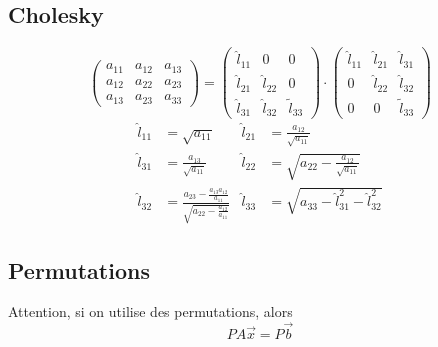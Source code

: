 \documentclass[]{article}
\begin{document}
\begin{multicols}{3}
\subsection{Cholesky}
$$\begin{pmatrix}
a_{11} & a_{12} & a_{13}\\
a_{12} & a_{22} & a_{23}\\
a_{13} & a_{23} & a_{33}
\end{pmatrix}=\begin{pmatrix}
\hat{l}_{11} & 0 & 0\\
\hat{l}_{21} & \hat{l}_{22} & 0\\
\hat{l}_{31} & \hat{l}_{32} & \tilde{l}_{33}
\end{pmatrix}\cdot\begin{pmatrix}
\hat{l}_{11} & \hat{l}_{21} & \hat{l}_{31}\\
0 & \hat{l}_{22} & \hat{l}_{32}\\
0 & 0 & \tilde{l}_{33}
\end{pmatrix}$$
\begin{align*}
\hat{l}_{11}&=\sqrt{a_{11}} & \hat{l}_{21}&=\frac{a_{12}}{\sqrt{a_{11}}}\\
\hat{l}_{31}&=\frac{a_{13}}{\sqrt{a_{11}}} & \hat{l}_{22}&=\sqrt{a_{22}-\frac{a_{12}}{\sqrt{a_{11}}}}\\
\hat{l}_{32}&=\frac{a_{23}-\frac{a_{13}a_{12}}{a_{11}}}{\sqrt{a_{22}-\frac{a_{12}}{a_{11}}}} & \hat{l}_{33}&=\sqrt{a_{33}-\hat{l}_{31}^2-\hat{l}_{32}^2}
\end{align*}
\subsection{Permutations}
Attention, si on utilise des permutations, alors
$$PA\vec{x}=P\vec{b}$$

\end{multicols}
\end{document}
